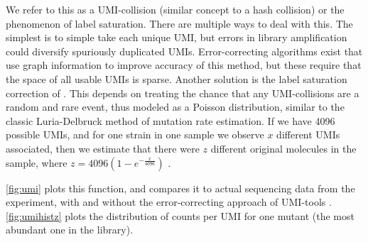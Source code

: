 We refer
to this as a UMI-collision (similar concept to a hash collision) or the
phenomenon of label saturation. 
There are multiple ways to deal with this.
The simplest is to simple take each unique UMI, but errors in library
amplification could diversify spuriously duplicated UMIs.
Error-correcting algorithms 
exist that use graph information to improve accuracy of this method, but
these require that the space of all usable UMIs is sparse. 
Another solution is the label saturation correction of 
\cite{fu2011counting}. This depends
on treating the chance that any UMI-collisions are a random and rare
event, thus modeled as a Poisson distribution, similar to the classic
Luria-Delbruck method of mutation rate estimation. 
If we have 4096 possible
UMIs, and for one strain in one sample we observe \(x\) different UMIs
associated, then we estimate that there were \(z\) different original
molecules in the sample, where
\(z=4096 (1-e^{-\frac{x}{4096}})\) .

\label{subsubsection:rarefractionDiscussion}

\autoref{fig:umi} plots this function, and compares it to
actual sequencing data from the experiment, with and without
the error-correcting approach of UMI-tools \parencite{smith2017umi}.
\autoref{fig:umihistz} plots the distribution of counts per UMI
for one mutant (the most abundant one in the library). 



